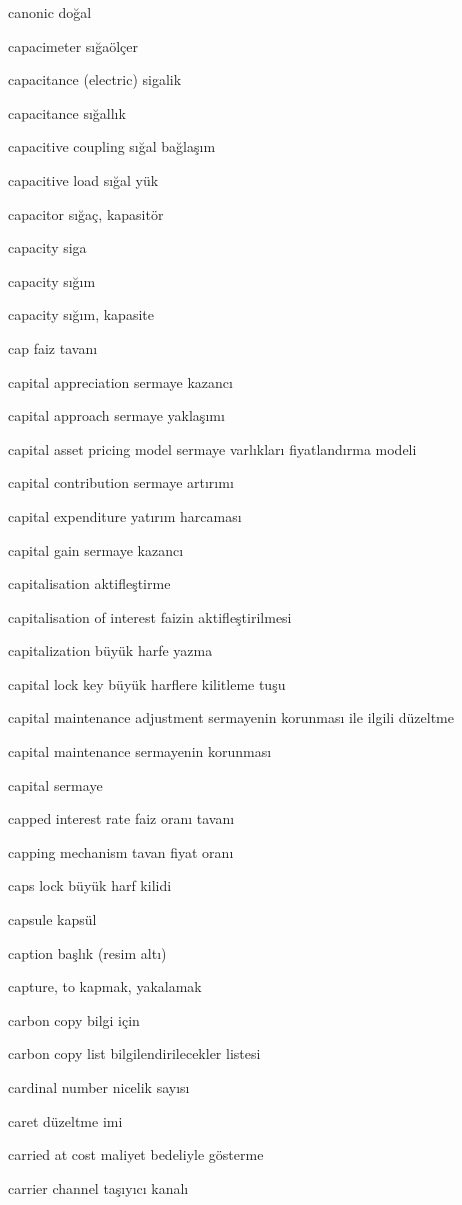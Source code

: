 \documentclass[12pt,fleqn]{article}\usepackage{../../common}
\begin{document}
canonic doğal

capacimeter sığaölçer

capacitance (electric) sigalik

capacitance sığallık

capacitive coupling sığal bağlaşım

capacitive load sığal yük

capacitor sığaç, kapasitör

capacity siga

capacity sığım

capacity sığım, kapasite

cap faiz tavanı

capital appreciation sermaye kazancı

capital approach sermaye yaklaşımı

capital asset pricing model sermaye varlıkları fiyatlandırma modeli

capital contribution sermaye artırımı

capital expenditure yatırım harcaması

capital gain sermaye kazancı

capitalisation aktifleştirme

capitalisation of interest faizin aktifleştirilmesi

capitalization büyük harfe yazma

capital lock key büyük harflere kilitleme tuşu

capital maintenance adjustment sermayenin korunması ile ilgili düzeltme

capital maintenance sermayenin korunması

capital sermaye

capped interest rate faiz oranı tavanı

capping mechanism tavan fiyat oranı

caps lock büyük harf kilidi

capsule kapsül

caption başlık (resim altı)

capture, to kapmak, yakalamak

carbon copy bilgi için

carbon copy list bilgilendirilecekler listesi

cardinal number nicelik sayısı

caret düzeltme imi

carried at cost maliyet bedeliyle gösterme

carrier channel taşıyıcı kanalı
\end{document}
